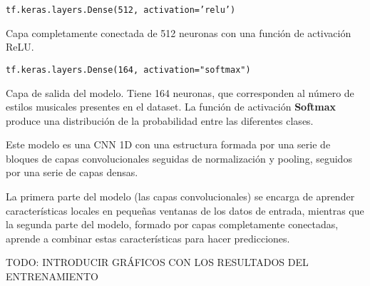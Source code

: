 \texttt{tf.keras.layers.Dense(512, activation='relu')}

Capa completamente conectada de 512 neuronas con una función de activación ReLU.

\texttt{tf.keras.layers.Dense(164, activation="softmax")}

Capa de salida del modelo. Tiene 164 neuronas, que corresponden al número de estilos musicales presentes en el dataset. La función de activación \textbf{Softmax} produce una distribución de la probabilidad entre las diferentes clases.

Este modelo es una CNN 1D con una estructura formada por una serie de bloques de capas convolucionales seguidas de normalización y pooling, seguidos por una serie de capas densas.

La primera parte del modelo (las capas convolucionales) se encarga de aprender características locales en pequeñas ventanas de los datos de entrada, mientras que la segunda parte del modelo, formado por capas completamente conectadas, aprende a combinar estas características para hacer predicciones.

TODO: INTRODUCIR GRÁFICOS CON LOS RESULTADOS DEL ENTRENAMIENTO